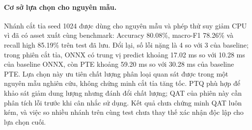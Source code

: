 \paragraph{Cơ sở lựa chọn cho nguyên mẫu.} Nhánh cắt tỉa seed 1024 được dùng cho nguyên mẫu và phép thử suy giảm CPU vì đã có asset xuất cùng benchmark: Accuracy 80.08\%, macro-F1 78.26\% và recall high 85.19\% trên test đã lưu. Đổi lại, số lỗi nặng là 4 so với 3 của baseline; trong phiên cắt tỉa, ONNX có trung vị predict khoảng 17.02 ms so với 10.28 ms của baseline ONNX, còn PTE khoảng 59.20 ms so với 30.28 ms của baseline PTE. Lựa chọn này ưu tiên chất lượng phân loại quan sát được trong một nguyên mẫu nghiên cứu, không chứng minh cắt tỉa tăng tốc. PTQ phù hợp để khảo sát giảm dung lượng nhưng đánh đổi chất lượng; QAT của phiên này cần phân tích lỗi trước khi cân nhắc sử dụng. Kết quả chưa chứng minh QAT luôn kém, và việc so nhiều nhánh trên cùng test chưa thay thế xác nhận độc lập cho lựa chọn cuối.
